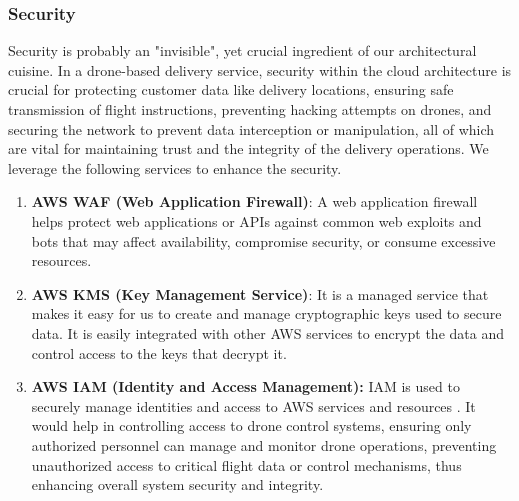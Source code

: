 \documentclass{article}
\begin{document}
\subsubsection{Security}
Security is probably an "invisible", yet crucial ingredient of our architectural cuisine. In a drone-based delivery service, security within the cloud architecture is crucial for protecting customer data like delivery locations, ensuring safe transmission of flight instructions, preventing hacking attempts on drones, and securing the network to prevent data interception or manipulation, all of which are vital for maintaining trust and the integrity of the delivery operations. We leverage the following services to enhance the security.
\begin{enumerate}
    \item \textbf{AWS WAF (Web Application Firewall)}: A web application firewall helps protect web applications or APIs against common web exploits and bots that may affect availability, compromise security, or consume excessive resources. \cite{wafirewall}
    \item \textbf{AWS KMS (Key Management Service)}: It is a managed service that makes it easy for us to create and manage cryptographic keys used to secure data. It is easily integrated with other AWS services to encrypt the data and control access to the keys that decrypt it. \cite{kms}
    \item \textbf{AWS IAM (Identity and Access Management):} IAM is used to securely manage identities and access to AWS services and resources \cite{iam}. It would help in controlling access to drone control systems, ensuring only authorized personnel can manage and monitor drone operations, preventing unauthorized access to critical flight data or control mechanisms, thus enhancing overall system security and integrity.
\end{enumerate}
\end{document}
